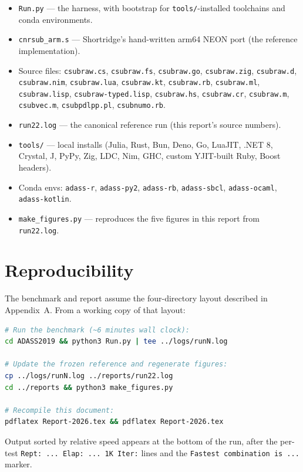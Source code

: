 \documentclass[11pt,a4paper]{article}
\begin{document}
\begin{itemize}\small
\item \texttt{Run.py} --- the harness, with bootstrap for
\texttt{tools/}-installed toolchains and conda environments.
\item \texttt{cnrsub\_arm.s} --- Shortridge's hand-written arm64 NEON
port (the reference implementation).
\item Source files: \texttt{csubraw.cs}, \texttt{csubraw.fs},
\texttt{csubraw.go}, \texttt{csubraw.zig}, \texttt{csubraw.d},
\texttt{csubraw.nim}, \texttt{csubraw.lua}, \texttt{csubraw.kt},
\texttt{csubraw.rb}, \texttt{csubraw.ml}, \texttt{csubraw.lisp},
\texttt{csubraw-typed.lisp}, \texttt{csubraw.hs}, \texttt{csubraw.cr},
\texttt{csubraw.m}, \texttt{csubvec.m}, \texttt{csubpdlpp.pl},
\texttt{csubnumo.rb}.
\item \texttt{run22.log} --- the canonical reference run (this
report's source numbers).
\item \texttt{tools/} --- local installs (Julia, Rust, Bun, Deno,
Go, LuaJIT, .NET 8, Crystal, J, PyPy, Zig, LDC, Nim, GHC,
custom YJIT-built Ruby, Boost headers).
\item Conda envs: \texttt{adass-r}, \texttt{adass-py2},
\texttt{adass-rb}, \texttt{adass-sbcl}, \texttt{adass-ocaml},
\texttt{adass-kotlin}.
\item \texttt{make\_figures.py} --- reproduces the five figures in
this report from \texttt{run22.log}.
\end{itemize}

\section{Reproducibility}

The benchmark and report assume the four-directory layout described
in Appendix~A. From a working copy of that layout:

\begin{lstlisting}[language=bash]
# Run the benchmark (~6 minutes wall clock):
cd ADASS2019 && python3 Run.py | tee ../logs/runN.log

# Update the frozen reference and regenerate figures:
cp ../logs/runN.log ../reports/run22.log
cd ../reports && python3 make_figures.py

# Recompile this document:
pdflatex Report-2026.tex && pdflatex Report-2026.tex
\end{lstlisting}

\noindent
Output sorted by relative speed appears at the bottom of the run,
after the per-test \texttt{Rept: ... Elap: ... 1K Iter:} lines and
the \texttt{Fastest combination is ...} marker.
\end{document}
